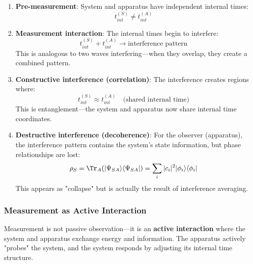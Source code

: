 \begin{enumerate}
    \item \textbf{Pre-measurement}: System and apparatus have independent internal times:
    \begin{equation}
        t_{int}^{(S)} \neq t_{int}^{(A)}
    \end{equation}
    
    \item \textbf{Measurement interaction}: The internal times begin to interfere:
    \begin{equation}
        t_{int}^{(S)} + t_{int}^{(A)} \to \text{interference pattern}
    \end{equation}
    This is analogous to two waves interfering—when they overlap, they create a combined pattern.
    
    \item \textbf{Constructive interference (correlation)}: The interference creates regions where:
    \begin{equation}
        t_{int}^{(S)} \approx t_{int}^{(A)} \quad \text{(shared internal time)}
    \end{equation}
    This is entanglement—the system and apparatus now share internal time coordinates.
    
    \item \textbf{Destructive interference (decoherence)}: For the observer (apparatus), the interference pattern contains the system's state information, but phase relationships are lost:
    \begin{equation}
        \rho_S = \Tr_A(|\Psi_{SA}\rangle\langle\Psi_{SA}|) = \sum_i |c_i|^2 |\phi_i\rangle\langle\phi_i|
    \end{equation}
    This appears as "collapse" but is actually the result of interference averaging.
\end{enumerate}

\subsubsection{Measurement as Active Interaction}

\begin{insight}[Measurement = Active Energy Exchange]
Measurement is not passive observation—it is an \textbf{active interaction} where the system and apparatus exchange energy and information. The apparatus actively "probes" the system, and the system responds by adjusting its internal time structure.
\end{insight}

